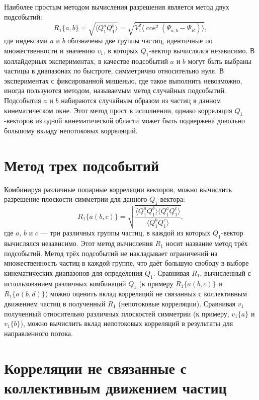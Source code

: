 Наиболее простым методом вычисления разрешения является метод двух подсобытий:
%
\begin{equation}
    R_1\{a,b\} = \sqrt{ \langle Q_1^a Q_1^b \rangle } = \sqrt{ V_1^2 \langle \cos^{2}( \Psi_{a,b} - \Psi_R ) \rangle },
\end{equation}
где индексами $a$ и $b$ обозначены две группы частиц, идентичные по множественности и значению $v_1$, в которых $Q_1$-вектор вычислялся независимо.
В коллайдерных экспериментах, в качестве подсобытий $a$ и $b$ могут быть выбраны частицы в диапазонах по быстроте, симметрично относительно нуля.
В экспериментах с фиксированной мишенью, где такое выполнить невозможно, иногда пользуются методом, называемым метод случайных подсобытий.
Подсобытия $a$ и $b$ набираются случайным образом из частиц в данном кинематическом окне.
Этот метод прост в исполнении, однако корреляция $Q_1$-векторов из одной кинематической области может быть подвержена довольно большому вкладу непотоковых корреляций.

\section{Метод трех подсобытий}

Комбинируя различные попарные корреляции векторов, можно вычислить разрешение плоскости симметрии для данного $Q_1$-вектора:
%
\begin{equation}
    R_1\{a(b,c)\}  =  \sqrt { \frac{ \langle Q_1^a Q_1^b \rangle \langle Q_1^a Q_1^c \rangle }{ \langle Q_1^b Q_1^c \rangle} },
\end{equation}
%
где $a$, $b$ и $c$ --- три различных группы частиц, в каждой из которых $Q_1$-вектор вычислялся независимо.
Этот метод вычисления $R_1$ носит название метод трёх подсобытий.
Метод трёх подсобытий не накладывает ограничений на множественность частиц в каждой группе, что даёт большую свободу в выборе кинематических диапазонов для определения $Q_1$. 
Сравнивая $R_1$, вычисленный с использованием различных комбинаций $Q_1$ (к примеру $R_1\{a(b,c)\}$ и $R_1\{a(b,d)\}$) можно оценить вклад корреляций не связанных с коллективным движением частиц в полученный $R_1$ (непотоковые корреляции).
Сравнивая $v_1$ полученный относительно различных плоскостей симметрии (к примеру, $v_1\{a\}$ и $v_1\{b\}$), можно вычислить вклад непотоковых корреляций в результаты для направленного потока. 

\section{Корреляции не связанные с коллективным движением частиц}

